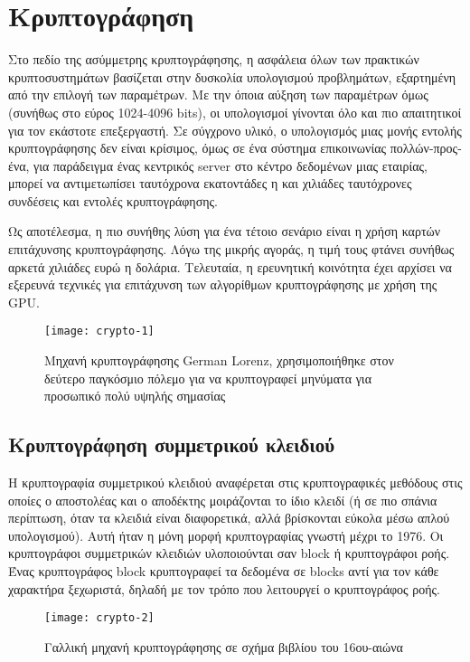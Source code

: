 \section{Κρυπτογράφηση}
Στο πεδίο της ασύμμετρης κρυπτογράφησης, η ασφάλεια όλων των πρακτικών κρυπτοσυστημάτων βασίζεται στην δυσκολία υπολογισμού προβλημάτων, εξαρτημένη από την επιλογή των παραμέτρων. Με την όποια αύξηση των παραμέτρων όμως (συνήθως στο εύρος 1024-4096 bits), οι υπολογισμοί γίνονται όλο και πιο απαιτητικοί για τον εκάστοτε επεξεργαστή. Σε σύγχρονο υλικό, ο υπολογισμός μιας μονής εντολής κρυπτογράφησης δεν είναι κρίσιμος, όμως σε ένα σύστημα επικοινωνίας πολλών-προς-ένα, για παράδειγμα ένας κεντρικός server στο κέντρο δεδομένων μιας εταιρίας, μπορεί να αντιμετωπίσει ταυτόχρονα εκατοντάδες η και χιλιάδες ταυτόχρονες συνδέσεις και εντολές κρυπτογράφησης.

Ως αποτέλεσμα, η πιο συνήθης λύση για ένα τέτοιο σενάριο είναι η χρήση καρτών επιτάχυνσης κρυπτογράφησης. Λόγω της μικρής αγοράς, η τιμή τους φτάνει συνήθως αρκετά χιλιάδες ευρώ η δολάρια.
Τελευταία, η ερευνητική κοινότητα έχει αρχίσει να εξερευνά τεχνικές για επιτάχυνση των αλγορίθμων κρυπτογράφησης με χρήση της GPU. \cite{cryptography-1}

\begin{figure}[h]
\centering
\texttt{[image: crypto-1]}
\caption{Μηχανή κρυπτογράφησης German Lorenz, χρησιμοποιήθηκε στον δεύτερο παγκόσμιο πόλεμο για να κρυπτογραφεί μηνύματα για προσωπικό πολύ υψηλής σημασίας\cite{figure-7}}
\end{figure}

\subsection{Κρυπτογράφηση συμμετρικού κλειδιού}
Η κρυπτογραφία συμμετρικού κλειδιού αναφέρεται στις κρυπτογραφικές μεθόδους στις οποίες ο αποστολέας και ο αποδέκτης μοιράζονται το ίδιο κλειδί (ή σε πιο σπάνια περίπτωση, όταν τα κλειδιά είναι διαφορετικά, αλλά βρίσκονται εύκολα μέσω απλού υπολογισμού). Αυτή ήταν η μόνη μορφή κρυπτογραφίας γνωστή μέχρι το 1976.
Οι κρυπτογράφοι συμμετρικών κλειδιών υλοποιούνται σαν block ή κρυπτογράφοι ροής. Ένας κρυπτογράφος block κρυπτογραφεί τα δεδομένα σε blocks αντί για τον κάθε χαρακτήρα ξεχωριστά, δηλαδή με τον τρόπο που λειτουργεί ο κρυπτογράφος ροής.\cite{cryptography-2}


\begin{figure}[h]
\centering
\texttt{[image: crypto-2]}
\caption{Γαλλική μηχανή κρυπτογράφησης σε σχήμα βιβλίου του 16ου-αιώνα\cite{figure-8}}
\end{figure}

